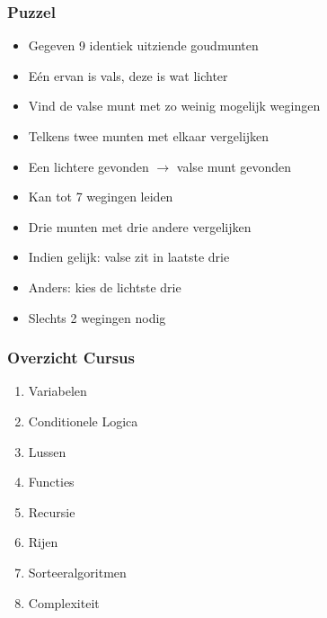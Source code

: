 \begin{frame}
  \frametitle{Puzzel}
  \begin{center}
  \end{center}  
  \begin{overprint}
    \begin{itemize}
      \item Gegeven 9 identiek uitziende goudmunten
      \item E\'en ervan is vals, deze is wat lichter
      \item Vind de valse munt met zo weinig mogelijk wegingen
    \end{itemize}

    \begin{itemize}
      \item Telkens twee munten met elkaar vergelijken
      \item Een lichtere gevonden $\rightarrow$ valse munt gevonden
      \item Kan tot 7 wegingen leiden
    \end{itemize}

    \begin{itemize}
      \item Drie munten met drie andere vergelijken
      \item Indien gelijk: valse zit in laatste drie
      \item Anders: kies de lichtste drie
      \item Slechts 2 wegingen nodig
    \end{itemize}

  \end{overprint}
\end{frame}

\begin{frame}
  \frametitle{Overzicht Cursus}
  \begin{enumerate}
    \item Variabelen
    \item Conditionele Logica
    \item Lussen
    \item Functies
    \item Recursie
    \item Rijen
    \item Sorteeralgoritmen
    \item Complexiteit
  \end{enumerate}
\end{frame}


